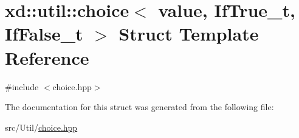 \hypertarget{structxd_1_1util_1_1choice}{}\section{xd\+:\+:util\+:\+:choice$<$ value, If\+True\+\_\+t, If\+False\+\_\+t $>$ Struct Template Reference}
\label{structxd_1_1util_1_1choice}


{\ttfamily \#include $<$choice.\+hpp$>$}



The documentation for this struct was generated from the following file\+:\begin{DoxyCompactItemize}
\item 
src/\+Util/\mbox{\hyperlink{choice_8hpp}{choice.\+hpp}}\end{DoxyCompactItemize}
